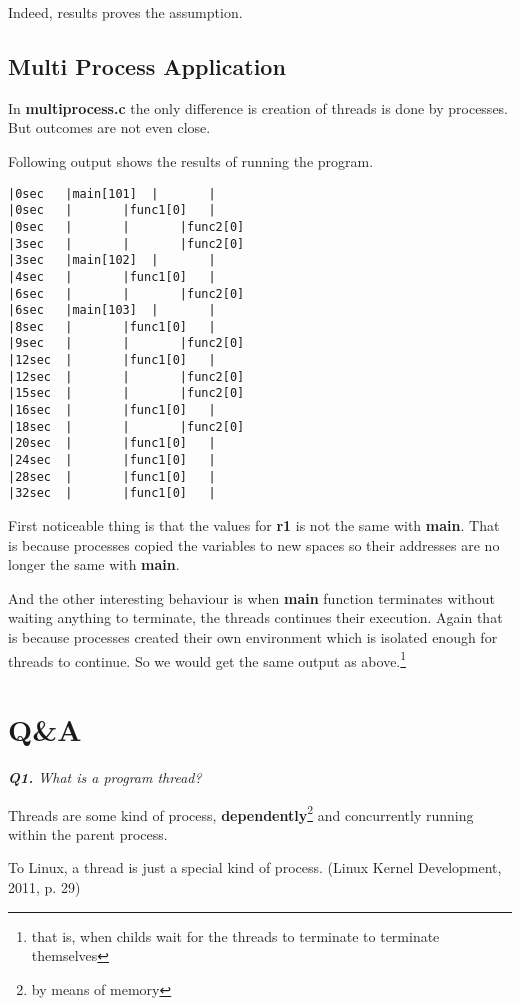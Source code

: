 \documentclass[11pt]{article}
\begin{document}
Indeed, results proves the assumption.

\newpage
\subsection*{Multi Process Application}
In \textbf{multiprocess.c} the only difference is creation of threads is done by processes. But outcomes are not even close.

Following output shows the results of running the program.

\begin{minipage}{1\textwidth}
\begin{lstlisting}[title=Timeline (multiprocess.c), frame=tlrb]
|0sec	|main[101]	|		|
|0sec	|		|func1[0]	|
|0sec	|		|		|func2[0]
|3sec	|		|		|func2[0]
|3sec	|main[102]	|		|
|4sec	|		|func1[0]	|
|6sec	|		|		|func2[0]
|6sec	|main[103]	|		|
|8sec	|		|func1[0]	|
|9sec	|		|		|func2[0]
|12sec	|		|func1[0]	|
|12sec	|		|		|func2[0]
|15sec	|		|		|func2[0]
|16sec	|		|func1[0]	|
|18sec	|		|		|func2[0]
|20sec	|		|func1[0]	|
|24sec	|		|func1[0]	|
|28sec	|		|func1[0]	|
|32sec	|		|func1[0]	|
\end{lstlisting}
\end{minipage}

First noticeable thing is that the values for \textbf{r1} is not the same with \textbf{main}. That is because processes copied the variables to new spaces so their addresses are no longer the same with \textbf{main}.

And the other interesting behaviour is when \textbf{main} function terminates without waiting anything to terminate, the threads continues their execution. Again that is because processes created their own environment which is isolated enough for threads to continue. So we would get the same output as above.\footnote{that is, when childs wait for the threads to terminate to terminate themselves }

\newpage
\section*{Q\&A}

\vspace{3mm}
\textit{\textbf{Q1.} What is a program thread?}
\vspace{3mm}

Threads are some kind of process, \textbf{dependently}\footnote{by means of memory} and concurrently running within the parent process.

\begin{displayquote}
To Linux, a thread is just a special kind of process. (Linux Kernel Development, 2011, p. 29)
\end{displayquote}
\end{document}
